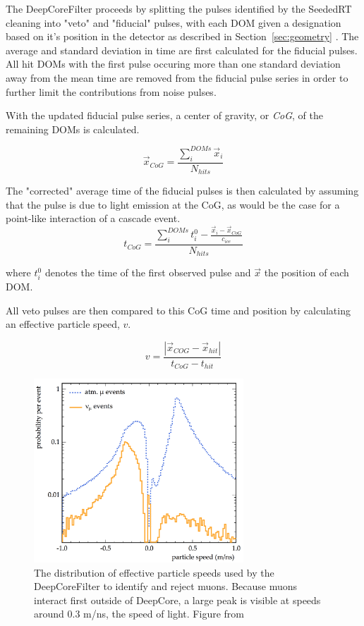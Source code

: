 The DeepCoreFilter proceeds by splitting the pulses identified by the SeededRT cleaning into "veto" and "fiducial" pulses, with each DOM given a designation based on it's position in the detector as described in Section~\ref{sec:geometry} \cite{Description-DeepCore,Thesis-Vuvuzela}.
The average and standard deviation in time are first calculated for the fiducial pulses.
All hit DOMs with the first pulse occuring more than one standard deviation away from the mean time are removed from the fiducial pulse series in order to further limit the contributions from noise pulses.

With the updated fiducial pulse series, a center of gravity, or \emph{CoG}, of the remaining DOMs is calculated.

\begin{equation}
	\vec{x}_{CoG}=\frac{\sum_i^{DOMs} \vec{x}_i}{N_{hits}}
\end{equation}

The "corrected" average time of the fiducial pulses is then calculated by assuming that the pulse is due to light emission at the CoG, as would be the case for a point-like interaction of a cascade event.
\begin{equation}
	t_{CoG} = \frac{\sum_i^{DOMs} t_i^0 - \frac{\vec{x}_i - \vec{x}_{CoG}}{c_{ice}}}{N_{hits}}
\end{equation}

where $t_i^0$ denotes the time of the first observed pulse and $\vec{x}$ the position of each DOM.

All veto pulses are then compared to this CoG time and position by calculating an effective particle speed, $v$.

\begin{equation}
v = \frac{\left| \vec{x}_{COG} - \vec{x}_{hit} \right|}{t_{CoG} - t_{hit}}
\end{equation}

\begin{figure}
\centering
\includegraphics[width=0.7\textwidth]{deepcore_speeds.png}
\caption{The distribution of effective particle speeds used by the DeepCoreFilter to identify and reject muons. Because muons interact first outside of DeepCore, a large peak is visible at speeds around 0.3 m/ns, the speed of light. Figure from \cite{Description-DeepCore}}
\label{fig:deepcore_speeds}
\end{figure}

